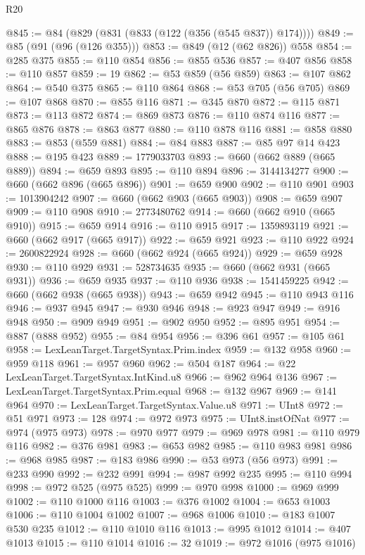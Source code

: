 \begin{lexlean}{R20}
\begin{coremodule}
@845 := @84 (@829 (@831 (@833 (@122 (@356 (@545 @837)) @174))))
@849 := @85 (@91 (@96 (@126 @355)))
@853 := @849 (@12 (@62 @826)) @558
@854 := @285 @375
@855 := @110 @854
@856 := @855 @536
@857 := @407 @856
@858 := @110 @857
@859 := 19
@862 := @53 @859 (@56 @859)
@863 := @107 @862
@864 := @540 @375
@865 := @110 @864
@868 := @53 @705 (@56 @705)
@869 := @107 @868
@870 := @855 @116
@871 := @345 @870
@872 := @115 @871
@873 := @113 @872
@874 := @869 @873
@876 := @110 @874 @116
@877 := @865 @876
@878 := @863 @877
@880 := @110 @878 @116
@881 := @858 @880
@883 := @853 (@559 @881)
@884 := @84 @883
@887 := @85 @97 @14 @423
@888 := @195 @423
@889 := 1779033703
@893 := @660 (@662 @889 (@665 @889))
@894 := @659 @893
@895 := @110 @894
@896 := 3144134277
@900 := @660 (@662 @896 (@665 @896))
@901 := @659 @900
@902 := @110 @901
@903 := 1013904242
@907 := @660 (@662 @903 (@665 @903))
@908 := @659 @907
@909 := @110 @908
@910 := 2773480762
@914 := @660 (@662 @910 (@665 @910))
@915 := @659 @914
@916 := @110 @915
@917 := 1359893119
@921 := @660 (@662 @917 (@665 @917))
@922 := @659 @921
@923 := @110 @922
@924 := 2600822924
@928 := @660 (@662 @924 (@665 @924))
@929 := @659 @928
@930 := @110 @929
@931 := 528734635
@935 := @660 (@662 @931 (@665 @931))
@936 := @659 @935
@937 := @110 @936
@938 := 1541459225
@942 := @660 (@662 @938 (@665 @938))
@943 := @659 @942
@945 := @110 @943 @116
@946 := @937 @945
@947 := @930 @946
@948 := @923 @947
@949 := @916 @948
@950 := @909 @949
@951 := @902 @950
@952 := @895 @951
@954 := @887 (@888 @952)
@955 := @84 @954
@956 := @396 @61
@957 := @105 @61
@958 := LexLeanTarget.TargetSyntax.Prim.index
@959 := @132 @958
@960 := @959 @118
@961 := @957 @960
@962 := @504 @187
@964 := @22 LexLeanTarget.TargetSyntax.IntKind.u8
@966 := @962 @964 @136
@967 := LexLeanTarget.TargetSyntax.Prim.equal
@968 := @132 @967
@969 := @141 @964
@970 := LexLeanTarget.TargetSyntax.Value.u8
@971 := UInt8
@972 := @51 @971
@973 := 128
@974 := @972 @973
@975 := UInt8.instOfNat
@977 := @974 (@975 @973)
@978 := @970 @977
@979 := @969 @978
@981 := @110 @979 @116
@982 := @376 @981
@983 := @653 @982
@985 := @110 @983 @981
@986 := @968 @985
@987 := @183 @986
@990 := @53 @973 (@56 @973)
@991 := @233 @990
@992 := @232 @991
@994 := @987 @992 @235
@995 := @110 @994
@998 := @972 @525 (@975 @525)
@999 := @970 @998
@1000 := @969 @999
@1002 := @110 @1000 @116
@1003 := @376 @1002
@1004 := @653 @1003
@1006 := @110 @1004 @1002
@1007 := @968 @1006
@1010 := @183 @1007 @530 @235
@1012 := @110 @1010 @116
@1013 := @995 @1012
@1014 := @407 @1013
@1015 := @110 @1014
@1016 := 32
@1019 := @972 @1016 (@975 @1016)

\end{coremodule}
\end{lexlean}
